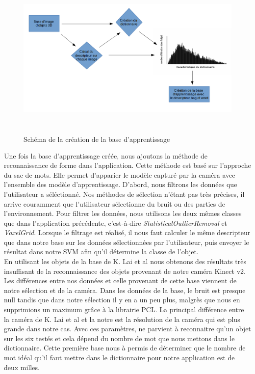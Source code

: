 \begin{figure}[!ht]
  \begin{center}
    \includegraphics[height=8cm]{image/schemaBase.png}
    \caption{Schéma de la création de la base d'apprentissage}
  \end{center}
\end{figure}
Une fois la base d'apprentissage créée, nous ajoutons la méthode de reconnaissance de forme dans l'application. Cette méthode est basé
sur l'approche du sac de mots. Elle permet d'apparier le modèle capturé par la caméra avec l'ensemble des modèle d'apprentissage.
D'abord, nous filtrons les données que l'utilisateur a séléctionné. Nos méthodes de sélection n'étant pas très précises, il arrive
couramment que l'utilisateur sélectionne du bruit ou des parties de l'environnement. Pour filtrer les données, nous utilisons
les deux mêmes classes que dans l'application précédente, c'est-à-dire \textit{StatisticalOutlierRemoval} et \textit{VoxelGrid}.
Lorsque le filtrage est réalisé, il nous faut calculer le même descripteur que dans notre base sur les données sélectionnées par 
l'utilisateur, puis envoyer le résultat dans notre SVM afin qu'il détermine la classe de l'objet.\\

En utilisant les objets de la base de K. Lai et al\cite{Base1} nous obtenons des résultats très insuffisant de la reconnaissance 
des objets provenant de notre caméra Kinect v2. Les différences entre nos données et celle provenant de cette base viennent
de notre sélection et de la caméra. Dans les données de la base, le bruit est presque null tandis que dans notre sélection il 
y en a un peu plus, malgrès que nous en supprimions un maximum grâce à la librairie PCL. La principal différence entre la caméra
de K. Lai et al\cite{Base1} et la notre est la résolution de la caméra qui est plus grande dans notre cas. Avec ces paramètres, ne parvient
à reconnaitre qu'un objet sur les six testés et cela dépend du nombre de mot que nous mettons dans le dictionnaire. Cette première base nous 
à permis de déterminer que le nombre de mot idéal qu'il faut mettre dans le dictionnaire pour notre application est de deux milles.\\

